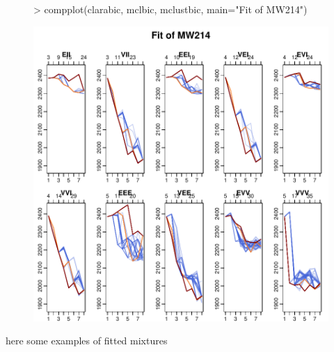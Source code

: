\begin{figure}[h]
\begin{Schunk}
\begin{Sinput}
>     compplot(clarabic, mclbic, mclustbic, main="Fit of MW214")
\end{Sinput}
\end{Schunk}
\includegraphics{chapter3-figMW214bic}
\end{figure}

here some examples of fitted mixtures

